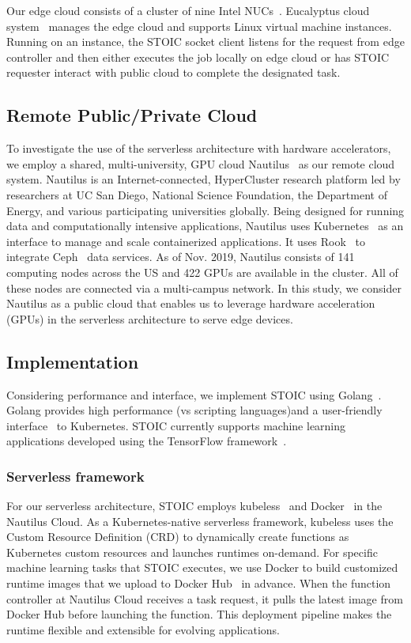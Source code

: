 Our edge cloud consists of a cluster of nine Intel NUCs~\cite{ref:nucs}.
Eucalyptus cloud system~\cite{ref:euca} manages the edge cloud and supports Linux virtual machine instances. Running on an instance, the STOIC socket client listens for the request from edge controller and then either executes the job locally on edge cloud or has STOIC requester interact with public cloud to complete the designated task.
 
 \subsection{Remote Public/Private Cloud}

To investigate the use of the serverless architecture with hardware accelerators, we employ a shared, multi-university, GPU cloud Nautilus~\cite{ref:nautilus} as our remote cloud system. Nautilus is an Internet-connected, HyperCluster research platform led by researchers at UC San Diego, National Science Foundation, the Department of Energy, and various participating universities globally.  Being designed for running data and computationally intensive applications, Nautilus uses Kubernetes~\cite{ref:k8s} as an interface to manage and scale containerized applications.  It uses Rook~\cite{ref:rook} to integrate Ceph~\cite{ref:ceph} data services. As of Nov. 2019, Nautilus consists of 141 computing nodes across the US and 422 GPUs are available in the cluster. All of these nodes are connected via a multi-campus network. In this study, we consider Nautilus as a public cloud that enables us to leverage hardware acceleration (GPUs) in the serverless architecture to serve edge devices. 
 
 \subsection{Implementation}
 
 Considering performance and interface, we
implement STOIC using Golang~\cite{ref:golang}. Golang provides high 
performance (vs scripting languages)and a user-friendly 
interface~\cite{ref:client-go} to Kubernetes.  STOIC currently supports machine learning applications developed using the TensorFlow  framework~\cite{ref:tensorflow}.
 
 \BlankLine
 \subsubsection{Serverless framework}
 For our serverless architecture, STOIC employs 
kubeless~\cite{ref:kubeless} and Docker~\cite{ref:docker} in the
 Nautilus Cloud. As a Kubernetes-native serverless framework, 
kubeless uses the Custom Resource Definition (CRD)\cite{ref:crd} to dynamically create functions as Kubernetes custom resources and launches runtimes on-demand. For specific machine learning tasks that STOIC executes, we use Docker to build customized runtime images that we upload to Docker 
Hub~\cite{ref:dockerhub} in advance. When the function controller 
at Nautilus Cloud receives a task request, it pulls the latest image 
from Docker Hub before launching the function. This deployment pipeline 
makes the runtime flexible and extensible for evolving applications. 
 
